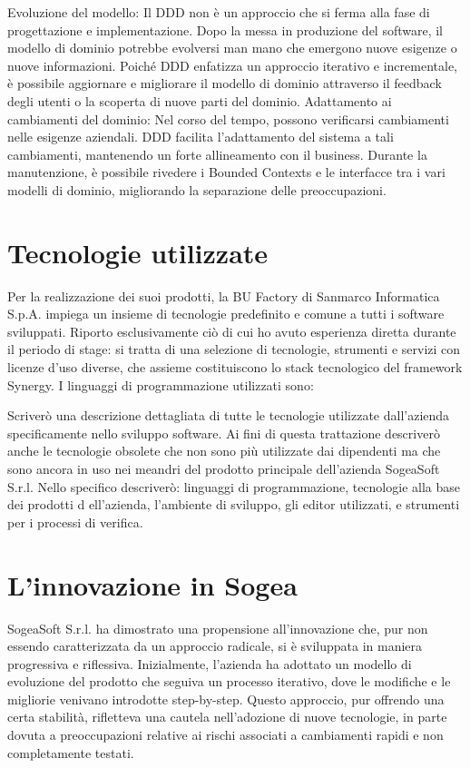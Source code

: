         Evoluzione del modello: Il DDD non è un approccio che si ferma alla fase di progettazione e implementazione. Dopo la messa in produzione del software, il modello di dominio potrebbe evolversi man mano che emergono nuove esigenze o nuove informazioni. Poiché DDD enfatizza un approccio iterativo e incrementale, è possibile aggiornare e migliorare il modello di dominio attraverso il feedback degli utenti o la scoperta di nuove parti del dominio.
Adattamento ai cambiamenti del dominio: Nel corso del tempo, possono verificarsi cambiamenti nelle esigenze aziendali. DDD facilita l'adattamento del sistema a tali cambiamenti, mantenendo un forte allineamento con il business. Durante la manutenzione, è possibile rivedere i Bounded Contexts e le interfacce tra i vari modelli di dominio, migliorando la separazione delle preoccupazioni.
    \section{Tecnologie utilizzate}
    Per la realizzazione dei suoi prodotti, la BU Factory di Sanmarco Informatica S.p.A. impiega un insieme di tecnologie predefinito e comune a tutti i software sviluppati. Riporto esclusivamente ciò di cui ho avuto esperienza diretta durante il periodo di stage: si tratta di una selezione di tecnologie, strumenti e servizi con licenze d’uso diverse, che assieme costituiscono lo stack tecnologico del framework Synergy.
I linguaggi di programmazione utilizzati sono:


    Scriverò una descrizione dettagliata di tutte le tecnologie utilizzate dall’azienda specificamente nello
    sviluppo software. Ai fini di questa trattazione descriverò anche le tecnologie obsolete che non sono
    più utilizzate dai dipendenti ma che sono ancora in uso nei meandri del prodotto principale
    dell’azienda SogeaSoft S.r.l.
    Nello specifico descriverò: linguaggi di programmazione, tecnologie alla base dei prodotti
    d   ell’azienda, l’ambiente di sviluppo, gli editor utilizzati, e       strumenti per i processi di verifica.
    \section{L’innovazione in Sogea}

    SogeaSoft S.r.l. ha dimostrato una propensione all'innovazione che, pur non essendo caratterizzata da un approccio radicale, si è sviluppata in maniera progressiva e riflessiva. Inizialmente, l'azienda ha adottato un modello di evoluzione del prodotto che seguiva un processo iterativo, dove le modifiche e le migliorie venivano introdotte step-by-step. Questo approccio, pur offrendo una certa stabilità, rifletteva una cautela nell'adozione di nuove tecnologie, in parte dovuta a preoccupazioni relative ai rischi associati a cambiamenti rapidi e non completamente testati.


